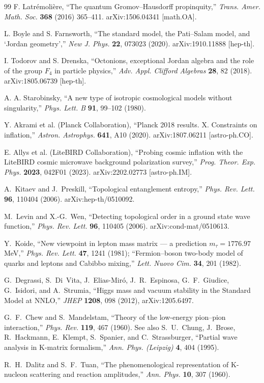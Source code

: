 \documentclass[12pt,a4paper]{article}
\theoremstyle{definition}
\begin{document}
\begin{thebibliography}{99}
F. Latr\'emoli\`ere, ``The quantum Gromov--Hausdorff propinquity,'' \textit{Trans. Amer. Math. Soc.} \textbf{368} (2016) 365--411. arXiv:1506.04341 [math.OA].

L. Boyle and S. Farnsworth, ``The standard model, the Pati--Salam model, and `Jordan geometry','' \textit{New J. Phys.} \textbf{22}, 073023 (2020). arXiv:1910.11888 [hep-th].

I. Todorov and S. Drenska, ``Octonions, exceptional Jordan algebra and the role of the group $F_4$ in particle physics,'' \textit{Adv. Appl. Clifford Algebras} \textbf{28}, 82 (2018). arXiv:1805.06739 [hep-th].

A. A. Starobinsky, ``A new type of isotropic cosmological models without singularity,'' \textit{Phys. Lett. B} \textbf{91}, 99--102 (1980).

Y. Akrami et al. (Planck Collaboration), ``Planck 2018 results. X. Constraints on inflation,'' \textit{Astron. Astrophys.} \textbf{641}, A10 (2020). arXiv:1807.06211 [astro-ph.CO].

E. Allys et al. (LiteBIRD Collaboration), ``Probing cosmic inflation with the LiteBIRD cosmic microwave background polarization survey,'' \textit{Prog. Theor. Exp. Phys.} \textbf{2023}, 042F01 (2023). arXiv:2202.02773 [astro-ph.IM].

A.~Kitaev and J.~Preskill, ``Topological entanglement entropy,'' \textit{Phys. Rev. Lett.} \textbf{96}, 110404 (2006). arXiv:hep-th/0510092.

M.~Levin and X.-G.~Wen, ``Detecting topological order in a ground state wave function,'' \textit{Phys. Rev. Lett.} \textbf{96}, 110405 (2006). arXiv:cond-mat/0510613.

Y.~Koide, ``New viewpoint in lepton mass matrix --- a prediction $m_\tau = 1776.97$ MeV,'' \textit{Phys. Rev. Lett.} \textbf{47}, 1241 (1981); ``Fermion--boson two-body model of quarks and leptons and Cabibbo mixing,'' \textit{Lett. Nuovo Cim.} \textbf{34}, 201 (1982).

G.~Degrassi, S.~Di~Vita, J.~Elias-Mir{\'o}, J.~R.~Espinosa, G.~F.~Giudice, G.~Isidori, and A.~Strumia, ``Higgs mass and vacuum stability in the Standard Model at NNLO,'' \textit{JHEP} \textbf{1208}, 098 (2012), arXiv:1205.6497.

G.~F.~Chew and S.~Mandelstam, ``Theory of the low-energy pion--pion interaction,'' \textit{Phys. Rev.} \textbf{119}, 467 (1960).
See also S.~U.~Chung, J.~Brose, R.~Hackmann, E.~Klempt, S.~Spanier, and C.~Strassburger, ``Partial wave analysis in K-matrix formalism,'' \textit{Ann. Phys. (Leipzig)} \textbf{4}, 404 (1995).

R.~H.~Dalitz and S.~F.~Tuan, ``The phenomenological representation of K-nucleon scattering and reaction amplitudes,'' \textit{Ann. Phys.} \textbf{10}, 307 (1960).

\end{thebibliography}
\end{document}
